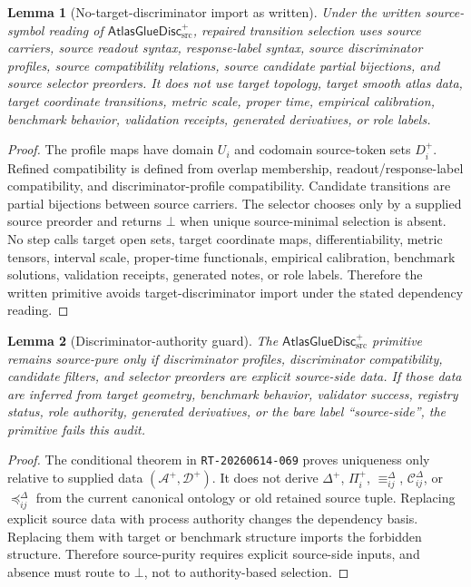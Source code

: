 \documentclass[11pt]{article}
\newcommand{\AtlasGlueDisc}{\mathsf{AtlasGlueDisc}_{\mathrm{src}}^{+}}
\newcommand{\Disc}{\Delta^{+}}
\newcommand{\Prof}{\Pi^{+}}
\newcommand{\Cand}{\mathcal{C}^{\Delta}}
\newtheorem{lemma}{Lemma}
\begin{document}
\begin{lemma}[No-target-discriminator import as written]
Under the written source-symbol reading of \(\AtlasGlueDisc\), repaired
transition selection uses source carriers, source readout syntax,
response-label syntax, source discriminator profiles, source compatibility
relations, source candidate partial bijections, and source selector preorders.
It does not use target topology, target smooth atlas data, target coordinate
transitions, metric scale, proper time, empirical calibration, benchmark
behavior, validation receipts, generated derivatives, or role labels.
\end{lemma}

\begin{proof}
The profile maps have domain \(U_i\) and codomain source-token sets
\(D_i^+\). Refined compatibility is defined from overlap membership,
readout/response-label compatibility, and discriminator-profile compatibility.
Candidate transitions are partial bijections between source carriers. The
selector chooses only by a supplied source preorder and returns \(\bot\) when
unique source-minimal selection is absent. No step calls target open sets,
target coordinate maps, differentiability, metric tensors, interval scale,
proper-time functionals, empirical calibration, benchmark solutions,
validation receipts, generated notes, or role labels. Therefore the written
primitive avoids target-discriminator import under the stated dependency
reading.
\end{proof}

\begin{lemma}[Discriminator-authority guard]
The \(\AtlasGlueDisc\) primitive remains source-pure only if discriminator
profiles, discriminator compatibility, candidate filters, and selector
preorders are explicit source-side data. If those data are inferred from
target geometry, benchmark behavior, validator success, registry status, role
authority, generated derivatives, or the bare label ``source-side'', the
primitive fails this audit.
\end{lemma}

\begin{proof}
The conditional theorem in \texttt{RT-20260614-069} proves uniqueness only
relative to supplied data \((\mathcal A^+,\mathcal D^+)\). It does not derive
\(\Disc\), \(\Prof_i\), \(\equiv_{ij}^{\Delta}\), \(\Cand_{ij}\), or
\(\preceq_{ij}^{\Delta}\) from the current canonical ontology or old retained
source tuple. Replacing explicit source data with process authority changes
the dependency basis. Replacing them with target or benchmark structure
imports the forbidden structure. Therefore source-purity requires explicit
source-side inputs, and absence must route to \(\bot\), not to authority-based
selection.
\end{proof}
\end{document}
